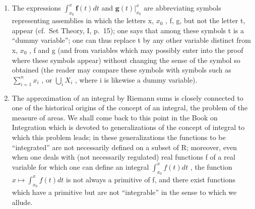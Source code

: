 \begin{enumerate}
\def\labelenumi{\arabic{enumi})}
\setcounter{enumi}{2}
\item
  The expressions \(\int_{x_{0}}^{x}\mathbf{f}(t)dt\) and \(\mathbf{g}(t)\bigg|_{x_{0}}^{x}\) are abbreviating symbols representing assemblies in which the letters x, \(x_{0}\) , f, g, but not the letter t, appear (cf.~Set Theory, I, p.~15); one says that among these symbols t is a ``dummy variable''; one can thus replace t by any other variable distinct from x, \(x_{0}\) , f and g (and from variables which may possibly enter into the proof where these symbols appear) without changing the sense of the symbol so obtained (the reader may compare these symbols with symbols such as \(\sum_{i=1}^{n}x_{i}\) , or \(\bigcup_{i}X_{i}\) , where i is likewise a dummy variable).
\item
  The approximation of an integral by Riemann sums is closely connected to one of the historical origins of the concept of an integral, the problem of the measure of areas. We shall come back to this point in the Book on Integration which is devoted to generalizations of the concept of integral to which this problem leads; in these generalizations the functions to be ``integrated'' are not necessarily defined on a subset of R; moreover, even when one deals with (not necessarily regulated) real functions f of a real variable for which one can define an integral \(\int_{x_{0}}^{x}f(t)dt\) , the function \(x\mapsto\int_{x_{0}}^{x}f(t)dt\) is not always a primitive of f, and there exist functions which have a primitive but are not ``integrable'' in the sense to which we allude.
\end{enumerate}
